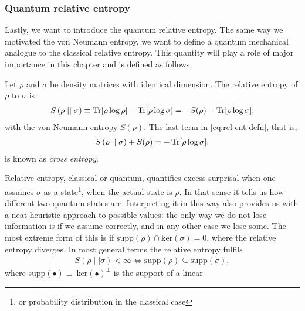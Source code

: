 \subsubsection{Quantum relative entropy}
Lastly, we want to introduce the quantum relative entropy. 
The same way we
motivated the von Neumann entropy, we want to define a quantum mechanical
analogue to the classical relative entropy. This quantity will play a role of
major importance in this chapter and is defined as follows.
\begin{defn}\label{defn:rel-ent}
  Let $\rho$ and $\sigma$ be density matrices with identical dimension. The
  relative entropy of $\rho$ to $\sigma$ is
  \begin{align}\label{eq:rel-ent-defn}
    S\left(\rho\mid\mid\sigma\right) \equiv \Tr[\rho\log\rho] -
    \Tr[\rho\log\sigma] = -S(\rho) - \Tr[\rho\log\sigma]
  ,\end{align}
  with the von Neumann entropy $S(\rho)$.
  The last term in \cref{eq:rel-ent-defn}, that is, 
  \begin{align}
    S\left( \rho\mid\mid\sigma \right) + S(\rho) = -\Tr[\rho\log\sigma]
  .\end{align}
  is known as \emph{cross entropy}. 
\end{defn}
Relative entropy, classical or quantum, quantifies excess surprisal when
one assumes $\sigma$ as a state\footnote{or probability distribution in the
classical case}, when the actual state is $\rho$. In that sense it tells us how
different two quantum states are. Interpreting it in this way also provides us
with a neat heuristic approach to possible values: the only way we do not lose
information is if we assume correctly, and in any other case we lose some. The
most extreme form of this is if $\mathrm{supp}(\rho)\cap\mathrm{ker}(\sigma)={0}$, where the
relative entropy diverges. In most general terms the relative entropy fulfils
\begin{align}\label{eq:inf-cond}
  S(\rho\mid\mid\sigma) < \infty \Longleftrightarrow \mathrm{supp}(\rho) \subseteq
  \mathrm{supp}(\sigma)
,\end{align}
where supp$(\bullet)\equiv\ $ker$(\bullet)^\perp$ is the support of a linear
